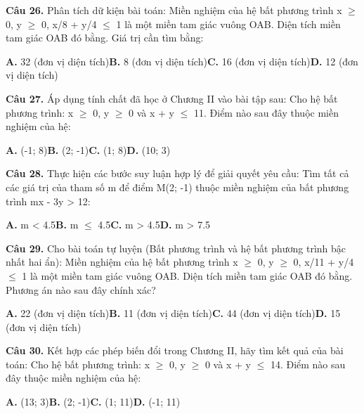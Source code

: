 \documentclass[11pt,a4paper]{article}
\begin{document}
\textbf{\color{primary} Câu 26.} Phân tích dữ kiện bài toán: Miền nghiệm của hệ bất phương trình x $\ge$ 0, y $\ge$ 0, x/8 + y/4 $\le$ 1 là một miền tam giác vuông OAB. Diện tích miền tam giác OAB đó bằng. Giá trị cần tìm bằng:\par
\hspace*{1.5em}\textbf{A.} 32 (đơn vị diện tích)\quad\quad \textbf{B.} 8 (đơn vị diện tích)\quad\quad \textbf{C.} 16 (đơn vị diện tích)\quad\quad \textbf{D.} 12 (đơn vị diện tích)\par\vspace{2pt}
\textbf{\color{primary} Câu 27.} Áp dụng tính chất đã học ở Chương II vào bài tập sau: Cho hệ bất phương trình: x $\ge$ 0, y $\ge$ 0 và x + y $\le$ 11. Điểm nào sau đây thuộc miền nghiệm của hệ:\par
\hspace*{1.5em}\textbf{A.} (-1; 8)\quad\quad \textbf{B.} (2; -1)\quad\quad \textbf{C.} (1; 8)\quad\quad \textbf{D.} (10; 3)\par\vspace{2pt}
\textbf{\color{primary} Câu 28.} Thực hiện các bước suy luận hợp lý để giải quyết yêu cầu: Tìm tất cả các giá trị của tham số m để điểm M(2; -1) thuộc miền nghiệm của bất phương trình mx - 3y > 12:\par
\hspace*{1.5em}\textbf{A.} m < 4.5\quad\quad \textbf{B.} m $\le$ 4.5\quad\quad \textbf{C.} m > 4.5\quad\quad \textbf{D.} m > 7.5\par\vspace{2pt}
\textbf{\color{primary} Câu 29.} Cho bài toán tự luyện (Bất phương trình và hệ bất phương trình bậc nhất hai ẩn): Miền nghiệm của hệ bất phương trình x $\ge$ 0, y $\ge$ 0, x/11 + y/4 $\le$ 1 là một miền tam giác vuông OAB. Diện tích miền tam giác OAB đó bằng. Phương án nào sau đây chính xác?\par
\hspace*{1.5em}\textbf{A.} 22 (đơn vị diện tích)\quad\quad \textbf{B.} 11 (đơn vị diện tích)\quad\quad \textbf{C.} 44 (đơn vị diện tích)\quad\quad \textbf{D.} 15 (đơn vị diện tích)\par\vspace{2pt}
\textbf{\color{primary} Câu 30.} Kết hợp các phép biến đổi trong Chương II, hãy tìm kết quả của bài toán: Cho hệ bất phương trình: x $\ge$ 0, y $\ge$ 0 và x + y $\le$ 14. Điểm nào sau đây thuộc miền nghiệm của hệ:\par
\hspace*{1.5em}\textbf{A.} (13; 3)\quad\quad \textbf{B.} (2; -1)\quad\quad \textbf{C.} (1; 11)\quad\quad \textbf{D.} (-1; 11)\par\vspace{2pt}
\end{document}
